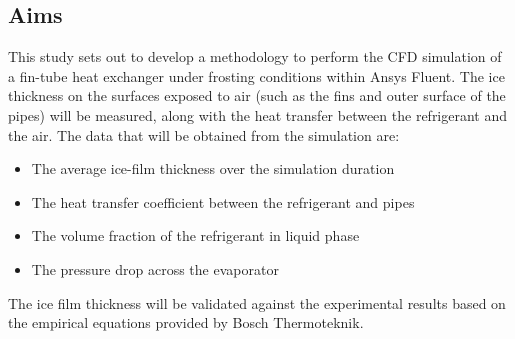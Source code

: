 \documentclass[11pt,a4paper,twoside,oneside]{article}
\begin{document}

\subsection{Aims}
\vspace{.3cm}
This study sets out to develop a methodology to perform the CFD simulation of a fin-tube heat exchanger under frosting conditions within Ansys Fluent. The ice thickness on the surfaces {exposed to air (such as the fins and outer surface of the pipes)} will be measured, along with the heat transfer between the refrigerant and the air. The data that will be obtained from the simulation are:
\begin{itemize}
    \item {The average ice-film thickness over the simulation duration}
    \item {The heat transfer coefficient between the refrigerant and pipes}
    \item {The volume fraction of the refrigerant in liquid phase}
    \item {The pressure drop across the evaporator}
\end{itemize}
{The ice film thickness will be validated against the experimental results based on the empirical equations provided by Bosch Thermoteknik.} %
\end{document}
